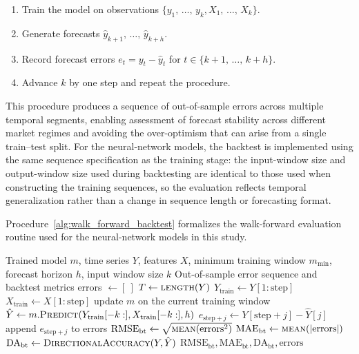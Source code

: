 \documentclass[pdflatex,sn-mathphys-num]{sn-jnl}%
\theoremstyle{thmstyleone}%
\theoremstyle{thmstyletwo}%
\theoremstyle{thmstylethree}%
\begin{document}
\begin{enumerate}
    \item Train the model on observations $\{y_1, \, \ldots, \, y_k, X_1, \, \ldots, \, X_k\}$.
    \item Generate forecasts $\hat{y}_{k+1}, \, \ldots, \, \hat{y}_{k+h}$.
    \item Record forecast errors $e_t = y_t - \hat{y}_t$ for $t \in \{k+1, \, \ldots, \, k+h\}$.
    \item Advance $k$ by one step and repeat the procedure.
\end{enumerate}

This procedure produces a sequence of out-of-sample errors across multiple temporal segments, enabling assessment of forecast stability across different market regimes and avoiding the over-optimism that can arise from a single train--test split. For the neural-network models, the backtest is implemented using the same sequence specification as the training stage: the input-window size and output-window size used during backtesting are identical to those used when constructing the training sequences, so the evaluation reflects temporal generalization rather than a change in sequence length or forecasting format.

Procedure~\ref{alg:walk_forward_backtest} formalizes the walk-forward evaluation routine used for the neural-network models in this study.

\begin{algorithm}[H]
\caption{Walk-Forward Backtesting for Neural Models}
\label{alg:walk_forward_backtest}
\begin{algorithmic}[1]
\Require Trained model $m$, time series $Y$, features $X$, minimum training window $m_{\min}$, forecast horizon $h$, input window size $k$
\Ensure Out-of-sample error sequence and backtest metrics
\State errors $\gets [\ ]$
\State $T \gets \textsc{length}(Y)$
    \State $Y_{\text{train}} \gets Y[1:\text{step}]$
    \State $X_{\text{train}} \gets X[1:\text{step}]$
    \State update $m$ on the current training window
    \State $\hat{Y} \gets m.\textsc{Predict}(Y_{\text{train}}[-k:], X_{\text{train}}[-k:], h)$
        \State $e_{\text{step}+j} \gets Y[\text{step}+j] - \hat{Y}[j]$
        \State append $e_{\text{step}+j}$ to errors
    \EndFor
\EndFor
\State $\mathrm{RMSE}_{\text{bt}} \gets \sqrt{\textsc{mean}(\text{errors}^2)}$
\State $\mathrm{MAE}_{\text{bt}} \gets \textsc{mean}(|\text{errors}|)$
\State $\mathrm{DA}_{\text{bt}} \gets \textsc{DirectionalAccuracy}(Y, \hat{Y})$
\State \Return $\mathrm{RMSE}_{\text{bt}}, \mathrm{MAE}_{\text{bt}}, \mathrm{DA}_{\text{bt}}, \text{errors}$
\end{algorithmic}
\end{algorithm}
\end{document}
